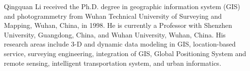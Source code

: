 \documentclass{ieeeaccess}
\begin{document}
\begin{IEEEbiography}{Qingquan Li} received the Ph.D. degree in geographic information system (GIS) and photogrammetry from Wuhan Technical University of Surveying and Mapping, Wuhan, China, in 1998. He is currently a Professor with Shenzhen University, Guangdong, China, and Wuhan University, Wuhan, China. His research areas include 3-D and dynamic data modeling in GIS, location-based service, surveying engineering, integration of GIS, Global Positioning System and remote sensing, intelligent transportation system, and urban informatics.
\end{IEEEbiography}

\EOD
\end{document}
